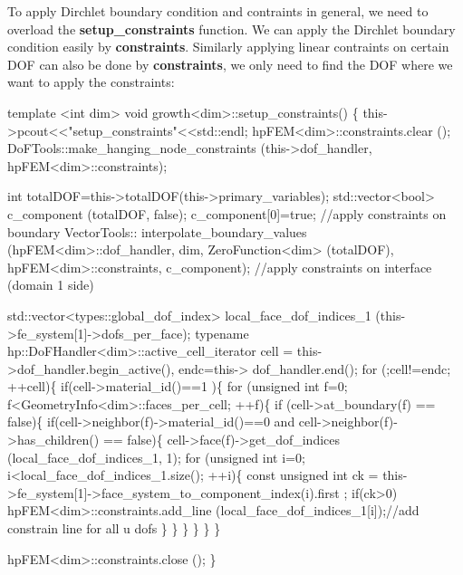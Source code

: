  To apply Dirchlet boundary condition and contraints in general, we need to overload the {\bfseries setup\-\_\-constraints} function. We can apply the Dirchlet boundary condition easily by {\bfseries constraints}. Similarly applying linear contraints on certain D\-O\-F can also be done by {\bfseries  constraints}, we only need to find the D\-O\-F where we want to apply the constraints\-: 
\begin{DoxyCode}
\textcolor{keyword}{template} <\textcolor{keywordtype}{int} dim>
\textcolor{keywordtype}{void} growth<dim>::setup\_constraints()
\{
    this->pcout<<\textcolor{stringliteral}{"setup\_constraints"}<<std::endl;
    hpFEM<dim>::constraints.clear ();
    DoFTools::make\_hanging\_node\_constraints (this->dof\_handler, 
      hpFEM<dim>::constraints);
    
    \textcolor{keywordtype}{int} totalDOF=this->totalDOF(this->primary\_variables);
  std::vector<bool> c\_component (totalDOF, \textcolor{keyword}{false}); c\_component[0]=\textcolor{keyword}{true}; 
    \textcolor{comment}{//apply constraints on boundary}
    VectorTools:: interpolate\_boundary\_values (hpFEM<dim>::dof_handler, dim, ZeroFunction<dim> (totalDOF),
      hpFEM<dim>::constraints, c\_component);
    \textcolor{comment}{//apply constraints on interface (domain 1 side)}
    
    std::vector<types::global\_dof\_index> local\_face\_dof\_indices\_1 (this->fe\_system[1]->dofs\_per\_face);
  \textcolor{keyword}{typename} hp::DoFHandler<dim>::active\_cell\_iterator cell = this->dof\_handler.begin\_active(), endc=this->
      dof\_handler.end();
  \textcolor{keywordflow}{for} (;cell!=endc; ++cell)\{
        \textcolor{keywordflow}{if}(cell->material\_id()==1 )\{
        \textcolor{keywordflow}{for} (\textcolor{keywordtype}{unsigned} \textcolor{keywordtype}{int} f=0; f<GeometryInfo<dim>::faces\_per\_cell; ++f)\{
                \textcolor{keywordflow}{if} (cell->at\_boundary(f) == \textcolor{keyword}{false})\{
                    \textcolor{keywordflow}{if}(cell->neighbor(f)->material\_id()==0 and cell->neighbor(f)->has\_children() == \textcolor{keyword}{false})\{
                    cell->face(f)->get\_dof\_indices (local\_face\_dof\_indices\_1, 1);
                    \textcolor{keywordflow}{for} (\textcolor{keywordtype}{unsigned} \textcolor{keywordtype}{int} i=0; i<local\_face\_dof\_indices\_1.size(); ++i)\{
                        \textcolor{keyword}{const} \textcolor{keywordtype}{unsigned} \textcolor{keywordtype}{int} ck = this->fe\_system[1]->face\_system\_to\_component\_index(i).first
      ;
                        \textcolor{keywordflow}{if}(ck>0) hpFEM<dim>::constraints.add\_line (local\_face\_dof\_indices\_1[i]);\textcolor{comment}{//add
       constrain line for all u dofs}
                    \}
                    \}
                \}
            \}
        \}
    \}
    
    hpFEM<dim>::constraints.close ();
\}
\end{DoxyCode}



